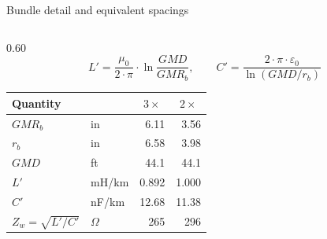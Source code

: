 \begin{frame}{Bundle detail and equivalent spacings}
\begin{columns}[c,onlytextwidth]
\begin{column}{0.60\textwidth}
      \[ L' = \frac{\mu_0}{2\cdot\pi}\cdot\ln\frac{GMD}{GMR_b},
         \qquad
         C' = \frac{2\cdot\pi\cdot\varepsilon_0}{\ln\left(GMD/r_b\right)} \]
      \renewcommand{\arraystretch}{1.0}
      {\footnotesize
      \begin{tabular}{@{}l l r r@{}}
        \textbf{Quantity} & & \multicolumn{1}{c}{\textbf{$3\times$}}
                            & \multicolumn{1}{c}{\textbf{$2\times$}} \\
        \hline
        $GMR_b$ & in & 6.11 & 3.56 \\
        $r_b$   & in & 6.58 & 3.98 \\
        $GMD$   & ft & 44.1 & 44.1 \\
        $L'$    & mH/km & 0.892 & 1.000 \\
        $C'$    & nF/km & 12.68 & 11.38 \\
        $Z_w=\sqrt{L'/C'}$ & $\Omega$ & 265 & 296 \\
        \hline
      \end{tabular}}
    \end{column}
  \end{columns}
\end{frame}
